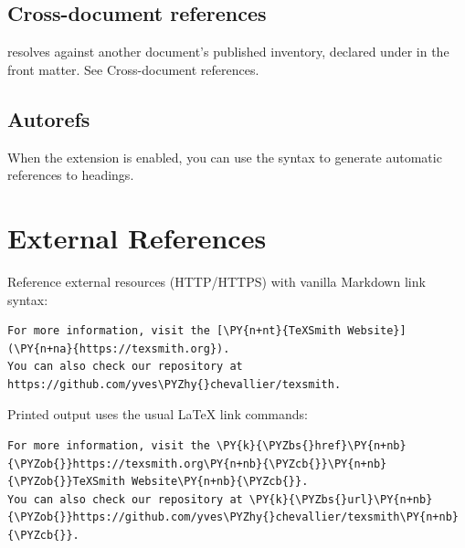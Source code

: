 \documentclass[a4paper,twoside]{article}
\begin{document}
\subsection{Cross-document references}
 resolves against another document's published inventory, declared
under  in the front matter. See
Cross-document references.
\subsection{Autorefs}
When the  extension is enabled, you can use the \tscodeinline{[text][label]} syntax to generate automatic references to headings.
\section{External References}
Reference external resources (HTTP/HTTPS) with vanilla Markdown link syntax:
\begin{tscode}[lang=md, engine=pygments]
\begin{Verbatim}[commandchars=\\\{\},breaklines, breakanywhere, commandchars=\\\{\}]
For more information, visit the [\PY{n+nt}{TeXSmith Website}](\PY{n+na}{https://texsmith.org}).
You can also check our repository at https://github.com/yves\PYZhy{}chevallier/texsmith.
\end{Verbatim}
\end{tscode}
Printed output uses the usual \LaTeX{} link commands:
\begin{tscode}[lang=latex, engine=pygments]
\begin{Verbatim}[commandchars=\\\{\},breaklines, breakanywhere, commandchars=\\\{\}]
For more information, visit the \PY{k}{\PYZbs{}href}\PY{n+nb}{\PYZob{}}https://texsmith.org\PY{n+nb}{\PYZcb{}}\PY{n+nb}{\PYZob{}}TeXSmith Website\PY{n+nb}{\PYZcb{}}.
You can also check our repository at \PY{k}{\PYZbs{}url}\PY{n+nb}{\PYZob{}}https://github.com/yves\PYZhy{}chevallier/texsmith\PY{n+nb}{\PYZcb{}}.
\end{Verbatim}
\end{tscode}
\end{document}
